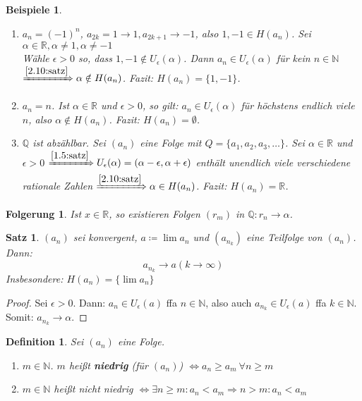 \documentclass[14pt,titlepage,ngerman,a4paper,headsepline,DIV15,halfparskip*]{scrartcl}
\newcommand{\N}{\mathbb{N}}
\newcommand{\Q}{\mathbb{Q}}
\newcommand{\R}{\mathbb{R}}
\theoremstyle{named}
\theoremstyle{dotless}
\newtheorem{satz}[namedtheorem]{Satz}
\newtheorem*{beispiele}{Beispiele}
\newtheorem*{definition}{Definition}
\newtheorem*{folgerung}{Folgerung}
\begin{document}
\begin{beispiele}\
	\begin{enumerate}
		\item $a_{n} = (-1)^{n}$, $a_{2k} = 1 \rightarrow 1, a_{2k+1} \rightarrow -1$, also $1, -1 \in H(a_{n})$. Sei $\alpha \in \R, \alpha \neq 1, \alpha \neq -1$ \\
			Wähle $\epsilon>0$ so, dass $1, -1 \notin U_{\epsilon}(\alpha)$. Dann $a_{n} \in U_{\epsilon}(\alpha)$ für kein $n \in \N$ $\xRightarrow[]{\ref{2.10:satz}} \alpha \notin H(a_{n})$. Fazit: $H(a_{n}) = \{ 1, -1 \}$.
		\item $a_{n} = n$. Ist $\alpha \in \R$ und $\epsilon > 0$, so gilt: $a_{n} \in U_{\epsilon}(\alpha)$ für höchstens endlich viele $n$, also $\alpha \notin H(a_{n})$. Fazit: $H(a_{n}) = \emptyset$.
		\item $\Q$ ist abzählbar. Sei $(a_{n})$ eine Folge mit $Q = \{ a_{1}, a_{2}, a_{3}, \dotsc \}$. Sei $\alpha \in \R$ und $\epsilon > 0$ $\xRightarrow[]{\ref{1.5:satz}} U_{\epsilon}(\alpha) = (\alpha - \epsilon, \alpha + \epsilon)$ enthält unendlich viele verschiedene rationale Zahlen $\xRightarrow[]{\ref{2.10:satz}} \alpha \in H(a_{n})$. Fazit: $H(a_{n}) = \R$.
	\end{enumerate}	
\end{beispiele}

\begin{folgerung}
Ist $x \in \R$, so existieren Folgen $(r_{m})$ in $\Q : r_{n} \rightarrow \alpha$.	
\end{folgerung}


\begin{satz} \label{2.11:satz} 
	$(a_{n})$ sei konvergent, $a \coloneqq \lim a_{n}$ und $(a_{n_{k}})$ eine Teilfolge von $(a_{n})$. Dann:
	$$ a_{n_{k}} \rightarrow a (k \rightarrow \infty) $$
	Insbesondere: $H(a_{n}) = \{ \lim a_{n} \}$
\end{satz}

\begin{proof}
	Sei $\epsilon > 0$. Dann: $a_{n} \in U_{\epsilon}(a)$ ffa $n \in \N$, also auch $a_{n_{k}} \in U_{\epsilon}(a)$ ffa $k \in \N$. Somit: $a_{n_{k}} \rightarrow \alpha$.
\end{proof}

\begin{definition} Sei $(a_{n})$ eine Folge. 
	\begin{enumerate}
		\item $m \in \N$. $m$ hei{\ss}t \textbf{niedrig} (für $(a_{n})$) $\iff a_{n} \geq a_{m} ~\forall n \geq m $
		\item $m \in \N$ hei{\ss}t nicht niedrig $\iff \exists n \geq m: a_{n} < a_{m} \Rightarrow n > m: a_{n} < a_{m}$
	\end{enumerate}
\end{definition}
\end{document}
